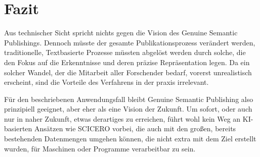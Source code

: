 \section{Fazit}
\label{sec:fazit}

Aus technischer Sicht spricht nichts gegen die Vision des Genuine Semantic Publishings.
Dennoch müsste der gesamte Publikationsprozess verändert werden, traditionelle, Textbasierte Prozesse müssten abgelöst werden durch solche, die den Fokus auf die Erkenntnisse und deren präzise Repräsentation legen.
Da ein solcher Wandel, der die Mitarbeit aller Forschender bedarf, vorerst unrealistisch erscheint, sind die Vorteile des Verfahrens in der praxis irrelevant.

Für den beschriebenen Anwendungsfall bleibt Genuine Semantic Publishing also prinzipiell geeignet, aber eher als eine Vision der Zukunft.
Um sofort, oder auch nur in naher Zukunft, etwas derartiges zu erreichen, führt wohl kein Weg an KI-basierten Ansätzen wie SCICERO vorbei, die auch mit den großen, bereits bestehenden Datenmengen umgehen können, die nicht extra mit dem Ziel erstellt wurden, für Maschinen oder Programme verarbeitbar zu sein.
